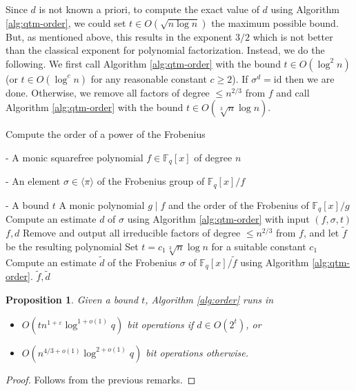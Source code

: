 \documentclass{article}
\theoremstyle{plain}
\newtheorem{proposition}[theorem]{Proposition}
\theoremstyle{definition}
\newcommand{\algbox}[1]{
	\begin{tcolorbox}[width = 0.8\textwidth, colback = white, arc = 2pt, boxrule = 0.5pt] 
		#1 
	\end{tcolorbox}
}
\newcommand{\lrang}[1]{\langle#1\rangle}
\def\F{\ensuremath{\mathbb{F}}}
\begin{document}
Since $d$ is not known a priori, to compute the exact value of $d$ using Algorithm 
\ref{alg:qtm-order}, we could set $t \in O(\sqrt{n \log n})$ the maximum possible bound. But, as 
mentioned above, this results in the exponent $3 / 2$ which is not better than the classical 
exponent for polynomial factorization. Instead, we do the following. We first call Algorithm 
\ref{alg:qtm-order} with the bound $t \in O(\log^2n)$ (or $t \in O(\log^cn)$ for any reasonable 
constant $c \ge 2$). If $\sigma^d = \text{id}$ then we are done. Otherwise, we remove all factors 
of degree $\le n^{2 / 3}$ from $f$ and call Algorithm \ref{alg:qtm-order} with the bound $t \in 
O(\sqrt[3]{n} \log n)$. 

\begin{algorithm}[t]
	\caption{Compute the order of a power of the Frobenius}
	\label{alg:order}
	\centering
	\algbox{
	\begin{algorithmic}[1]
		\Require 
		\item[-] A monic squarefree polynomial $f \in \F_q[x]$ of degree $n$
		\item[-] An element $\sigma \in \lrang{\pi}$ of the Frobenius group of $\F_q[x] / f$
		\item[-] A bound $t$
		\Ensure A monic polynomial $g \mid f$ and the order of the Frobenius of $\F_q[x] / g$
		\State Compute an estimate $d$ of $\sigma$ using Algorithm \ref{alg:qtm-order} with input 
		$(f, \sigma, t)$
		\If {$\sigma^d = \text{id}$}
			\State \Return $f, d$
		\EndIf
		\State Remove and output all irreducible factors of degree $\le n^{2 / 3}$ from 
		$f$, and let $\tilde{f}$ be the resulting polynomial
		\State Set $t = c_1\sqrt[3]{n} \log n$ for a suitable constant $c_1$
		\State Compute an estimate $\tilde{d}$ of the Frobenius $\sigma$ of $\F_q[x] / \tilde{f}$ 
		using Algorithm \ref{alg:qtm-order}.
		\State \Return $\tilde{f}, \tilde{d}$
	\end{algorithmic}}
\end{algorithm}

\begin{proposition}
	\label{prop:exact-d}
	Given a bound $t$, Algorithm \ref{alg:order} runs in
	\begin{itemize}
		\item $O(tn^{1 + \varepsilon}\log^{1 + o(1)}q)$ bit operations if $d \in O(2^t)$, or
		\item $O(n^{4 / 3 + o(1)}\log^{2 + o(1)}q)$ bit operations otherwise.
	\end{itemize}
\end{proposition}
\begin{proof}
	Follows from the previous remarks.
\end{proof}
\end{document}
